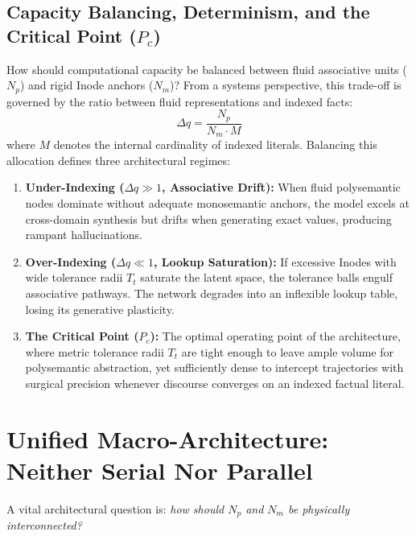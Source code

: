 \documentclass[10pt,twocolumn]{article}
\theoremstyle{definition}
\begin{document}
\subsection{Capacity Balancing, Determinism, and the Critical Point (\texorpdfstring{$P_c$}{Pc})}
How should computational capacity be balanced between fluid associative units ($N_p$) and rigid Inode anchors ($N_m$)? From a systems perspective, this trade-off is governed by the ratio between fluid representations and indexed facts:
\begin{equation}
    \Delta q = \frac{N_p}{N_m \cdot M}
\end{equation}
where $M$ denotes the internal cardinality of indexed literals. Balancing this allocation defines three architectural regimes:
\begin{enumerate}[leftmargin=*, itemsep=1.5pt]
    \item \textbf{Under-Indexing ($\Delta q \gg 1$, Associative Drift):} When fluid polysemantic nodes dominate without adequate monosemantic anchors, the model excels at cross-domain synthesis but drifts when generating exact values, producing rampant hallucinations.
    \item \textbf{Over-Indexing ($\Delta q \ll 1$, Lookup Saturation):} If excessive Inodes with wide tolerance radii $T_t$ saturate the latent space, the tolerance balls engulf associative pathways. The network degrades into an inflexible lookup table, losing its generative plasticity.
    \item \textbf{The Critical Point ($P_c$):} The optimal operating point of the architecture, where metric tolerance radii $T_t$ are tight enough to leave ample volume for polysemantic abstraction, yet sufficiently dense to intercept trajectories with surgical precision whenever discourse converges on an indexed factual literal.
\end{enumerate}

\section{Unified Macro-Architecture: Neither Serial Nor Parallel}

A vital architectural question is: \textit{how should $N_p$ and $N_m$ be physically interconnected?}
\end{document}
